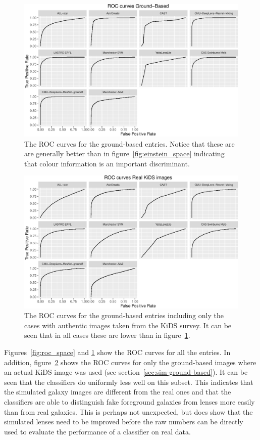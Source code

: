 \documentclass[useAMS,usenatbib]{mnras}
\begin{document}
\begin{figure}
 \includegraphics[width=2\columnwidth]{figures/roc_ground.pdf}
 \caption{The ROC curves for the ground-based entries.  Notice that these are are generally better than in figure~\ref{fig:einstein_space} indicating that colour information is an important discriminant. }
 \label{fig:roc_ground}
\end{figure}

\begin{figure}
 \includegraphics[width=2\columnwidth]{figures/roc_kids.pdf}
 \caption{The ROC curves for the ground-based entries including only the cases with authentic images taken from the KiDS survey.  It can be seen that in all cases these are lower than in figure~\ref{fig:roc_ground}.}
 \label{fig:roc_kids}
\end{figure}

Figures~\ref{fig:roc_space} and \ref{fig:roc_ground} show the ROC curves for all the entries.  In addition, figure~\ref{fig:roc_kids} shows the ROC curves for only the ground-based images where an actual KiDS image was used (see section~\ref{sec:sim-ground-based}).  It can be seen that the classifiers do uniformly less well on this subset.  This indicates that the simulated galaxy images are different from the real ones and that the classifiers are able to distinguish fake foreground galaxies from lenses more easily than from real galaxies.  This is perhaps not unexpected, but does show that the simulated lenses need to be improved before the raw numbers can be directly used to evaluate the performance of a classifier on real data.
\end{document}
